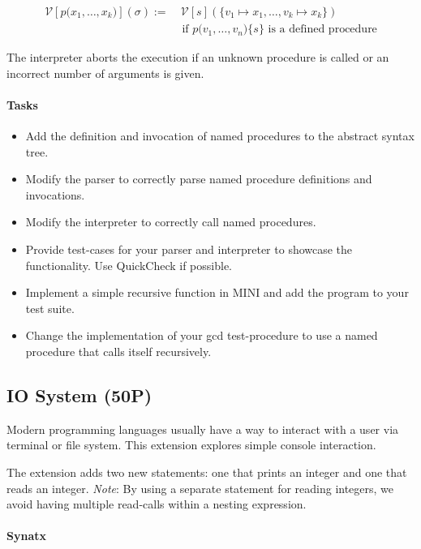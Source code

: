 \documentclass{article}
\newcommand\inParens[1]{\texttt{(}#1\texttt{)}}
\newcommand\inBraces[1]{\texttt{\{}#1\texttt{\}}}
\begin{document}
\begin{align}
\mathcal{V}[p\inParens{x_1, \ldots, x_k}](\sigma) :=& \ \mathcal{V}[s](\{v_1 \mapsto x_1, \ldots, v_k \mapsto x_k\}) \\ &\mbox{ if } p\inParens{v_1, \ldots, v_n}\inBraces{s} \mbox { is a defined procedure}
\end{align}


The interpreter aborts the execution if an unknown procedure is called or an incorrect number of arguments is given.

\paragraph{Tasks}

\begin{itemize}
\item Add the definition and invocation of named procedures to the abstract syntax tree.
\item Modify the parser to correctly parse named procedure definitions and invocations.
\item Modify the interpreter to correctly call named procedures.
\item Provide test-cases for your parser and interpreter to showcase the functionality. Use QuickCheck if possible.
\item Implement a simple recursive function in MINI and add the program to your test suite.
\item Change the implementation of your gcd test-procedure to use a named procedure that calls itself recursively.
\end{itemize}

\subsection{IO System (50P)}

Modern programming languages usually have a way to interact with a user via terminal or file system. This extension explores simple console interaction.

The extension adds two new statements: one that prints an integer and one that reads an integer. \textit{Note}: By using a separate statement for reading integers, we avoid having multiple read-calls within a nesting expression.

\paragraph{Synatx}
\end{document}

